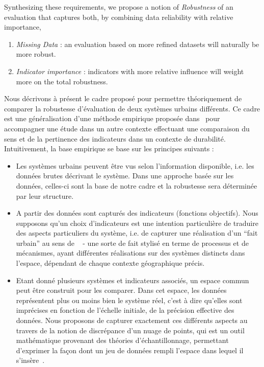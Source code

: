 {Synthesizing these requirements, we propose a notion of \emph{Robustness} of an evaluation that captures both, by combining data reliability with relative importance,
\begin{enumerate}
\item \emph{Missing Data} : an evaluation based on more refined datasets will naturally be more robust.
\item \emph{Indicator importance} : indicators with more relative influence will weight more on the total robustness.
\end{enumerate}
}{
Nous décrivons à présent le cadre proposé pour permettre théoriquement de comparer la robustesse d'évaluation de deux systèmes urbains différents. Ce cadre est une généralisation d'une méthode empirique proposée dans~\cite{ecodistrictReport} pour accompagner une étude dans un autre contexte effectuant une comparaison du sens et de la pertinence des indicateurs dans un contexte de durabilité. Intuitivement, la base empirique se base sur les principes suivants :

\begin{itemize}
\item Les systèmes urbains peuvent être vus selon l'information disponible, i.e. les données brutes décrivant le système. Dans une approche basée sur les données, celles-ci sont la base de notre cadre et la robustesse sera déterminée par leur structure.
\item A partir des données sont capturés des indicateurs (fonctions objectifs). Nous supposons qu'un choix d'indicateurs est une intention particulière de traduire des aspects particuliers du système, i.e. de capturer une réalisation d'un ``fait urbain'' au sens de ~\cite{mangin1999projet} - une sorte de fait stylisé en terme de processus et de mécanismes, ayant différentes réalisations sur des systèmes distincts dans l'espace, dépendant de chaque contexte géographique précis.
\item Etant donné plusieurs systèmes et indicateurs associés, un espace commun peut être construit pour les comparer. Dans cet espace, les données représentent plus ou moins bien le système réel, c'est à dire qu'elles sont imprécises en fonction de l'échelle initiale, de la précision effective des données. Nous proposons de capturer exactement ces différents aspects au travers de la notion de discrépance d'un nuage de points, qui est un outil mathématique provenant des théories d'échantillonnage, permettant d'exprimer la façon dont un jeu de données rempli l'espace dans lequel il s'insère~\cite{dick2010digital}.
\end{itemize}

}

